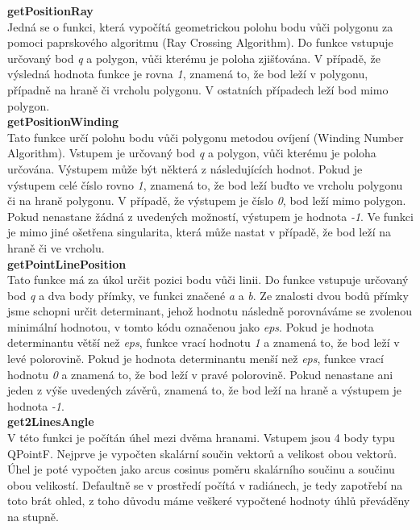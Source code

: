 \documentclass[a4paper, 12pt]{article}
\begin{document}
\textbf{getPositionRay}\\
Jedná se o funkci, která vypočítá geometrickou polohu bodu vůči polygonu za pomoci paprskového algoritmu (Ray Crossing Algorithm). Do funkce vstupuje určovaný bod \textit{q} a polygon, vůči kterému je poloha zjišťována. V případě, že výsledná hodnota funkce je rovna \textit{1}, znamená to, že bod leží v polygonu, případně na hraně či vrcholu polygonu. V ostatních případech leží bod mimo polygon.\\

\textbf{getPositionWinding}\\
Tato funkce určí polohu bodu vůči polygonu metodou ovíjení (Winding Number Algorithm). Vstupem je určovaný bod \textit{q} a polygon, vůči kterému je poloha určována. Výstupem může být některá z následujících hodnot. Pokud je výstupem celé číslo rovno \textit{1}, znamená to, že bod leží buďto ve vrcholu polygonu či na hraně polygonu. V případě, že výstupem je číslo \textit{0}, bod leží mimo polygon. Pokud nenastane žádná z uvedených možností, výstupem je hodnota \textit{-1}. Ve funkci je mimo jiné ošetřena singularita, která může nastat v případě, že bod leží na hraně či ve vrcholu.\\

\textbf{getPointLinePosition}\\
Tato funkce má za úkol určit pozici bodu vůči linii. Do funkce vstupuje určovaný bod \textit{q} a dva body přímky, ve funkci značené \textit{a} a \textit{b}. Ze znalosti dvou bodů přímky jsme schopni určit determinant, jehož hodnotu následně porovnáváme se zvolenou minimální hodnotou, v tomto kódu označenou jako \textit{eps}. Pokud je hodnota determinantu větší než \textit{eps}, funkce vrací hodnotu \textit{1} a znamená to, že bod leží v levé polorovině. Pokud je hodnota determinantu menší než \textit{eps}, funkce vrací hodnotu \textit{0} a znamená to, že bod leží v pravé polorovině. Pokud nenastane ani jeden z výše uvedených závěrů, znamená to, že bod leží na hraně a výstupem je hodnota \textit{-1}.\\

\textbf{get2LinesAngle}\\
V této funkci je počítán úhel mezi dvěma hranami. Vstupem jsou 4 body typu QPointF. Nejprve je vypočten skalární součin vektorů a velikost obou vektorů. Úhel je poté vypočten jako arcus cosinus poměru skalárního součinu a součinu obou velikostí. Defaultně se v prostředí počítá v radiánech, je tedy zapotřebí na toto brát ohled, z toho důvodu máme veškeré vypočtené hodnoty úhlů převáděny na stupně. \\
\end{document}
